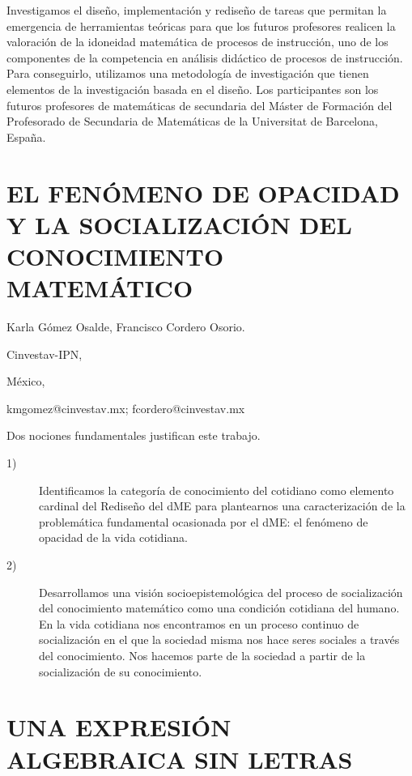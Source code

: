 Investigamos el diseño, implementación y rediseño de tareas que permitan
la emergencia de herramientas teóricas para que los futuros profesores
realicen la valoración de la idoneidad matemática de procesos de instrucción,
uno de los componentes de la competencia en análisis didáctico de
procesos de instrucción. Para conseguirlo, utilizamos una metodología
de investigación que tienen elementos de la investigación basada en
el diseño. Los participantes son los futuros profesores de matemáticas
de secundaria del Máster de Formación del Profesorado de Secundaria
de Matemáticas de la Universitat de Barcelona, España. 


\section{EL FENÓMENO DE OPACIDAD Y LA SOCIALIZACIÓN DEL CONOCIMIENTO MATEMÁTICO}

\begin{datos}

Karla Gómez Osalde, Francisco Cordero Osorio.

Cinvestav-IPN,

México,

kmgomez@cinvestav.mx; fcordero@cinvestav.mx

\end{datos}

Dos nociones fundamentales justifican este trabajo. 
\begin{description}
\item [{1)}] Identificamos la categoría de conocimiento del cotidiano como
elemento cardinal del Rediseño del dME para plantearnos una caracterización
de la problemática fundamental ocasionada por el dME: el fenómeno
de opacidad de la vida cotidiana. 
\item [{2)}] Desarrollamos una visión socioepistemológica del proceso de
socialización del conocimiento matemático como una condición cotidiana
del humano. En la vida cotidiana nos encontramos en un proceso continuo
de socialización en el que la sociedad misma nos hace seres sociales
a través del conocimiento. Nos hacemos parte de la sociedad a partir
de la socialización de su conocimiento. 
\end{description}

\section{\uppercase{ una expresión algebraica sin letras}}


